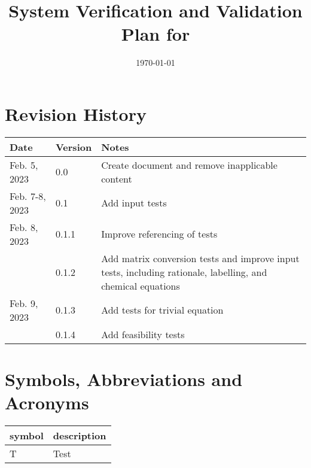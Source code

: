 \documentclass[12pt, titlepage]{article}
\begin{document}
\title{%
  System Verification and Validation Plan for \progname{}}
\author{\authname}
\date{\today}

\maketitle


\section{Revision History}

\begin{tabularx}{\textwidth}{llX}
  \toprule {\bf Date} & {\bf Version} & {\bf Notes}                     \\
  \midrule
  Feb. 5, 2023        & 0.0           & Create document and remove
  inapplicable content                                                  \\
  Feb. 7-8, 2023      & 0.1           & Add input tests                 \\
  Feb. 8, 2023        & 0.1.1         & Improve referencing of tests    \\
                      & 0.1.2         & Add matrix conversion tests and
  improve input tests, including rationale, labelling, and chemical
  equations                                                             \\
  Feb. 9, 2023        & 0.1.3         & Add tests for trivial equation  \\
                      & 0.1.4         & Add feasibility tests           \\
  \bottomrule
\end{tabularx}

\newpage

\tableofcontents

\listoftables
{}

\listoffigures
{}

\newpage

\section{Symbols, Abbreviations and Acronyms}

\renewcommand{\arraystretch}{1.2}
\begin{tabular}{l l}
  \toprule
  \textbf{symbol} & \textbf{description} \\
  \midrule
  T               & Test                 \\
  \bottomrule
\end{tabular}\\
\end{document}
